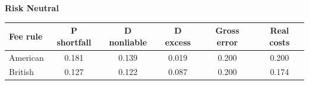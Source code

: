 \documentclass[10pt,border=5pt,varwidth=17cm]{standalone}
\begin{document}
\begingroup
\small
\setlength{\tabcolsep}{5pt}
\renewcommand{\arraystretch}{1.20}
\noindent\textbf{Risk Neutral}\par\smallskip
\noindent\begin{tabularx}{\linewidth}{@{}>{\raggedright\arraybackslash}Xccccc@{}}
\toprule
\textbf{Fee rule} & \textbf{P shortfall} & \textbf{D nonliable} & \textbf{D excess} & \textbf{Gross error} & \textbf{Real costs} \\
\midrule
American & 0.181 & 0.139 & 0.019 & 0.200 & 0.200 \\
British & 0.127 & 0.122 & 0.087 & 0.200 & 0.174 \\
\bottomrule\end{tabularx}\par\medskip
\endgroup
\end{document}

